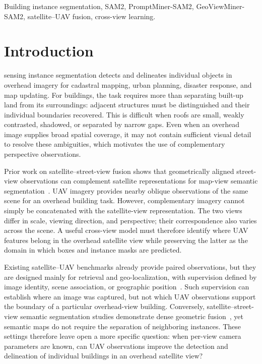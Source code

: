 \documentclass[letterpaper,journal]{IEEEtran}
\begin{document}
\begingroup
{}
\begin{IEEEkeywords}
Building instance segmentation, SAM2, PromptMiner-SAM2, GeoViewMiner-SAM2, satellite--UAV
fusion, cross-view learning.
\end{IEEEkeywords}
\endgroup


\section{Introduction}
 sensing instance segmentation detects and delineates individual objects
in overhead imagery for cadastral mapping, urban planning, disaster response, and map updating.
For buildings, the task requires more than separating built-up land from its surroundings:
adjacent structures must be distinguished and their individual boundaries recovered. This is
difficult when roofs are small, weakly contrasted, shadowed, or separated by narrow gaps. Even
when an overhead image supplies broad spatial coverage, it may not contain sufficient visual
detail to resolve these ambiguities, which motivates the use of complementary perspective
observations.

Prior work on satellite--street-view fusion shows that geometrically aligned street-view
observations can complement satellite representations for map-view semantic
segmentation~\cite{ref_sgbeyv,ref_crffnet}. UAV imagery provides nearby oblique observations of the same
scene for an overhead building task. However, complementary imagery cannot simply be
concatenated with the satellite-view representation. The two views differ in scale, viewing
direction, and perspective; their correspondence also varies across the scene. A useful
cross-view model must therefore identify where UAV features belong in the overhead satellite
view while preserving the latter as the domain in which boxes and instance masks are predicted.

Existing satellite--UAV benchmarks already provide paired observations, but they are designed
mainly for retrieval and geo-localization, with supervision defined by image identity, scene
association, or geographic position~\cite{ref_university,ref_denseuav,ref_unigeo}. Such supervision can
establish where an image was captured, but not which UAV observations support the boundary of a
particular overhead-view building. Conversely, satellite--street-view semantic segmentation
studies demonstrate dense geometric fusion~\cite{ref_sgbeyv,ref_crffnet}, yet semantic maps do not require
the separation of neighboring instances. These settings therefore leave open a more specific question: when
per-view camera parameters are known, can UAV observations improve the detection and
delineation of individual buildings in an overhead satellite view?
\end{document}

